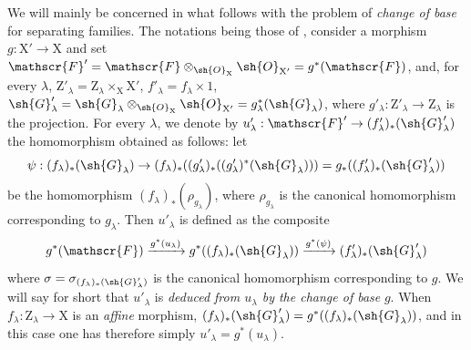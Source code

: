 \begin{env}[11.9.5]
\label{IV.11.9.5}
We will mainly be concerned in what follows with the problem of \emph{change of base} for separating families.
The notations being those of , consider a morphism $g:\mathrm{X}'\to\mathrm{X}$ and set $\mathscr{F}'=\mathscr{F}\otimes_{\sh{O}_\mathrm{X}}\sh{O}_{\mathrm{X}'}=g^*(\mathscr{F})$, and, for every $\lambda$, $\mathrm{Z}'_\lambda=\mathrm{Z}_\lambda\times_\mathrm{X}\mathrm{X}'$, $f'_\lambda=f_\lambda\times 1$, $\sh{G}'_\lambda=\sh{G}_\lambda\otimes_{\sh{O}_\mathrm{X}}\sh{O}_{\mathrm{X}'}=g_\lambda^*(\sh{G}_\lambda)$, where $g'_\lambda:\mathrm{Z}'_\lambda\to\mathrm{Z}_\lambda$ is the projection.
For every $\lambda$, we denote by $u'_\lambda:\mathscr{F}'\to(f'_\lambda)_*(\sh{G}'_\lambda)$ the homomorphism obtained as follows: let
\[
  \psi:(f_\lambda)_*(\sh{G}_\lambda)\to(f_\lambda)_*((g'_\lambda)_*((g'_\lambda)^*(\sh{G}_\lambda)))=g_*((f'_\lambda)_*(\sh{G}'_\lambda))
\]
be the homomorphism $(f_\lambda)_*(\rho_{g_\lambda})$, where $\rho_{g_\lambda}$ is the canonical homomorphism  corresponding to $g_\lambda$.
Then $u'_\lambda$ is defined as the composite
\[
  g^*(\mathscr{F})\xrightarrow{g^*(u_\lambda)}g^*((f_\lambda)_*(\sh{G}_\lambda))\xrightarrow{g^*(\psi)}(f'_\lambda)_*(\sh{G}'_\lambda)
\]
where $\sigma=\sigma_{(f_\lambda)_*(\sh{G}'_\lambda)}$ is the canonical homomorphism  corresponding to $g$.
We will say for short that $u'_\lambda$ is \emph{deduced from $u_\lambda$ by the change of base} $g$.
When $f_\lambda:\mathrm{Z}_\lambda\to\mathrm{X}$ is an \emph{affine} morphism, $(f_\lambda)_*(\sh{G}'_\lambda)=g^*((f_\lambda)_*(\sh{G}_\lambda))$, and in this case one has therefore simply $u'_\lambda=g^*(u_\lambda)$.


\end{env}
